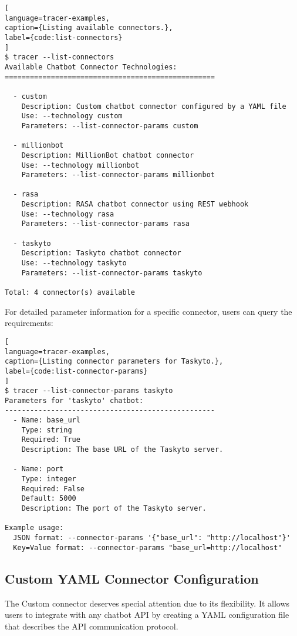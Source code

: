 \begin{lstlisting}[
language=tracer-examples,
caption={Listing available connectors.},
label={code:list-connectors}
]
$ tracer --list-connectors
Available Chatbot Connector Technologies:
==================================================
  
  - custom
    Description: Custom chatbot connector configured by a YAML file
    Use: --technology custom
    Parameters: --list-connector-params custom

  - millionbot
    Description: MillionBot chatbot connector
    Use: --technology millionbot
    Parameters: --list-connector-params millionbot

  - rasa
    Description: RASA chatbot connector using REST webhook
    Use: --technology rasa
    Parameters: --list-connector-params rasa

  - taskyto
    Description: Taskyto chatbot connector
    Use: --technology taskyto
    Parameters: --list-connector-params taskyto

Total: 4 connector(s) available
\end{lstlisting}

For detailed parameter information for a specific connector,
users can query the requirements:

\begin{lstlisting}[
language=tracer-examples,
caption={Listing connector parameters for Taskyto.},
label={code:list-connector-params}
]
$ tracer --list-connector-params taskyto
Parameters for 'taskyto' chatbot:
--------------------------------------------------
  - Name: base_url
    Type: string
    Required: True
    Description: The base URL of the Taskyto server.

  - Name: port
    Type: integer
    Required: False
    Default: 5000
    Description: The port of the Taskyto server.

Example usage:
  JSON format: --connector-params '{"base_url": "http://localhost"}'
  Key=Value format: --connector-params "base_url=http://localhost"
\end{lstlisting}

\subsection{Custom YAML Connector Configuration}

The Custom connector deserves special attention due to its flexibility.
It allows users to integrate with any chatbot \ac{API}
by creating a YAML configuration file that describes
the \ac{API} communication protocol.

